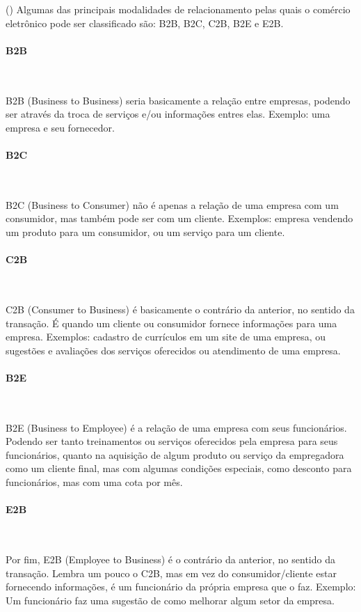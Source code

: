(\cite{b2c-web}) Algumas das principais modalidades de relacionamento pelas quais o comércio eletrônico pode ser classificado são: B2B, B2C, C2B, B2E e E2B.

\paragraph{B2B}\mbox{}\\
\par
B2B (Business to Business) seria basicamente a relação entre empresas, podendo ser através da troca de serviços e/ou informações entres elas. Exemplo: uma empresa e seu fornecedor.


\paragraph{B2C}\mbox{}\\
\par
B2C (Business to Consumer) não é apenas a relação de uma empresa com um consumidor, mas também pode ser com um cliente. Exemplos: empresa vendendo um produto para um consumidor, ou um serviço para um cliente.

\paragraph{C2B}\mbox{}\\
\par
C2B (Consumer to Business) é basicamente o contrário da anterior, no sentido da transação. É quando um cliente ou consumidor fornece informações para uma empresa. Exemplos: cadastro de currículos em um site de uma empresa, ou sugestões e avaliações dos serviços oferecidos ou atendimento de uma empresa.

\paragraph{B2E}\mbox{}\\
\par
B2E (Business to Employee) é a relação de uma empresa com seus funcionários. Podendo ser tanto treinamentos ou serviços oferecidos pela empresa para seus funcionários, quanto na aquisição de algum produto ou serviço da empregadora como um cliente final, mas com algumas condições especiais, como desconto para funcionários, mas com uma cota por mês.
\newpage


\paragraph{E2B}\mbox{}\\
\par
Por fim, E2B (Employee to Business) é o contrário da anterior, no sentido da transação. Lembra um pouco o C2B, mas em vez do consumidor/cliente estar fornecendo informações, é um funcionário da própria empresa que o faz. Exemplo: Um funcionário faz uma sugestão de como melhorar algum setor da empresa.

